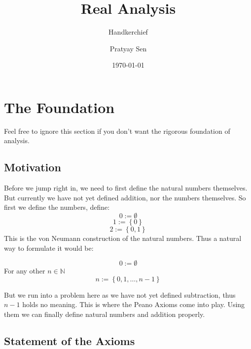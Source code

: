 \documentclass[a4paper,11pt,abstracton]{scrartcl}
\theoremstyle{dotlessP}
\theoremstyle{dotlessS}
\theoremstyle{remark}
\theoremstyle{definition}
\begin{document}

\title{Real Analysis}
\subtitle{Handkerchief}
\author{Pratyay Sen}
\date{\today}
\maketitle

\tableofcontents

\eject



\section{The Foundation}
 
Feel free to ignore this section if you don't want the rigorous foundation of analysis.

\subsection{Motivation}

Before we jump right in, we need to first define the natural numbers themselves. But currently we have not yet defined addition, nor the numbers themselves. So first we define the numbers, define:
$$0:=\emptyset$$
$$1:= \left\{0\right\}$$
$$2:= \left\{0,1\right\}$$
This is the von Neumann construction of the natural numbers. Thus a natural way to formulate it would be:

\begin{definition_box}
$$0:=\emptyset$$
For any other $n \in \mathbb{N}$
$$n:=\left\{0,1,\dots,n-1\right\}$$
\end{definition_box}

But we run into a problem here as we have not yet defined subtraction, thus $n-1$ holds no meaning. This is where the Peano Axioms come into play. Using them we can finally define natural numbers and addition properly.

\subsection{Statement of the Axioms}
\end{document}
